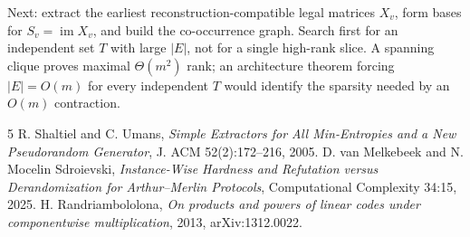 \documentclass[11pt]{article}
\begin{document}
Next: extract the earliest reconstruction-compatible legal matrices \(X_v\), form bases for \(S_v=\operatorname{im}X_v\), and build the co-occurrence graph. Search first for an independent set \(T\) with large \(|E|\), not for a single high-rank slice. A spanning clique proves maximal \(\Theta(m^2)\) rank; an architecture theorem forcing \(|E|=O(m)\) for every independent \(T\) would identify the sparsity needed by an \(O(m)\) contraction.

\begin{thebibliography}{5}
 R. Shaltiel and C. Umans, \emph{Simple Extractors for All Min-Entropies and a New Pseudorandom Generator}, J. ACM 52(2):172--216, 2005.
 D. van Melkebeek and N. Mocelin Sdroievski, \emph{Instance-Wise Hardness and Refutation versus Derandomization for Arthur--Merlin Protocols}, Computational Complexity 34:15, 2025.
 H. Randriambololona, \emph{On products and powers of linear codes under componentwise multiplication}, 2013, arXiv:1312.0022.
\end{thebibliography}
\end{document}
